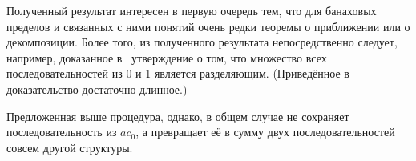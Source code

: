 Полученный результат интересен в первую очередь тем, что для банаховых пределов и связанных с ними понятий
очень редки теоремы о приближении или о декомпозиции.
Более того, из полученного результата непосредственно следует, например,
доказанное в~\cite{semenov2010characteristic} утверждение о том, что множество всех последовательностей из 0 и 1 является разделяющим.
(Приведённое в~\cite{semenov2010characteristic} доказательство достаточно длинное.)

Предложенная выше процедура, однако, в общем случае не сохраняет последовательность из $ac_0$,
а превращает её в сумму двух последовательностей совсем другой структуры.

